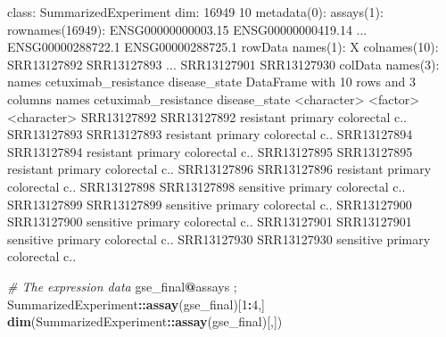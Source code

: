 \documentclass[
]{article}
\newenvironment{Shaded}{\begin{snugshade}}{\end{snugshade}}
\newcommand{\CommentTok}[1]{\textcolor[rgb]{0.56,0.35,0.01}{\textit{#1}}}
\newcommand{\DecValTok}[1]{\textcolor[rgb]{0.00,0.00,0.81}{#1}}
\newcommand{\FunctionTok}[1]{\textcolor[rgb]{0.13,0.29,0.53}{\textbf{#1}}}
\newcommand{\NormalTok}[1]{#1}
\newcommand{\SpecialCharTok}[1]{\textcolor[rgb]{0.81,0.36,0.00}{\textbf{#1}}}
\begin{document}
\begin{Shaded}
\begin{Highlighting}[]
\NormalTok{class: SummarizedExperiment }
\NormalTok{dim: 16949 10 }
\NormalTok{metadata(0):}
\NormalTok{assays(1): \textquotesingle{}\textquotesingle{}}
\NormalTok{rownames(16949): ENSG00000000003.15 ENSG00000000419.14 ...}
\NormalTok{  ENSG00000288722.1 ENSG00000288725.1}
\NormalTok{rowData names(1): X}
\NormalTok{colnames(10): SRR13127892 SRR13127893 ... SRR13127901 SRR13127930}
\NormalTok{colData names(3): names cetuximab\_resistance disease\_state}
\NormalTok{DataFrame with 10 rows and 3 columns}
\NormalTok{                  names cetuximab\_resistance          disease\_state}
\NormalTok{            \textless{}character\textgreater{}             \textless{}factor\textgreater{}            \textless{}character\textgreater{}}
\NormalTok{SRR13127892 SRR13127892            resistant primary colorectal c..}
\NormalTok{SRR13127893 SRR13127893            resistant primary colorectal c..}
\NormalTok{SRR13127894 SRR13127894            resistant primary colorectal c..}
\NormalTok{SRR13127895 SRR13127895            resistant primary colorectal c..}
\NormalTok{SRR13127896 SRR13127896            resistant primary colorectal c..}
\NormalTok{SRR13127898 SRR13127898            sensitive primary colorectal c..}
\NormalTok{SRR13127899 SRR13127899            sensitive primary colorectal c..}
\NormalTok{SRR13127900 SRR13127900            sensitive primary colorectal c..}
\NormalTok{SRR13127901 SRR13127901            sensitive primary colorectal c..}
\NormalTok{SRR13127930 SRR13127930            sensitive primary colorectal c..}
\end{Highlighting}
\end{Shaded}

\begin{Shaded}
\begin{Highlighting}[]
\CommentTok{\# The expression data}
\NormalTok{gse\_final}\SpecialCharTok{@}\NormalTok{assays ; SummarizedExperiment}\SpecialCharTok{::}\FunctionTok{assay}\NormalTok{(gse\_final)[}\DecValTok{1}\SpecialCharTok{:}\DecValTok{4}\NormalTok{,]}
\FunctionTok{dim}\NormalTok{(SummarizedExperiment}\SpecialCharTok{::}\FunctionTok{assay}\NormalTok{(gse\_final)[,])}
\end{Highlighting}
\end{Shaded}
\end{document}
